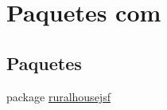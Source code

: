 \hypertarget{a00109}{}\section{Paquetes com}
\label{a00109}
\subsection*{Paquetes}
\begin{DoxyCompactItemize}
\item 
package \mbox{\hyperlink{a00110}{ruralhousejsf}}
\end{DoxyCompactItemize}
